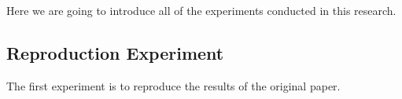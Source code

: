 Here we are going to introduce all of the experiments conducted in this research.

\subsection{Reproduction Experiment}

The first experiment is to reproduce the results of the original paper.



